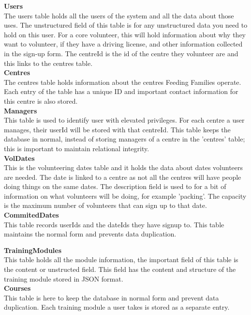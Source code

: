 \documentclass[12pt]{article}
\begin{document}
\noindent
\textbf{Users}\\
The users table holds all the users of the system and all the data about those uses. The unstructured field of this table is for any unstructured data you need to hold on this user. For a core volunteer, this will hold information about why they want to volunteer, if they have a driving license, and other information collected in the sign-up form. The centreId is the id of the centre they volunteer are and this links to the centres table.\\

\noindent
\textbf{Centres}\\
The centres table holds information about the centres Feeding Families operate. Each entry of the table has a unique ID and important contact information for this centre is also stored.\\

\noindent
\textbf{Managers}\\
This table is used to identify user with elevated privileges. For each centre a user manages, their userId will be stored with that centreId. This table keeps the database in normal, instead of storing managers of a centre in the 'centres' table; this is important to maintain relational integrity.\\

\noindent
\textbf{VolDates}\\
This is the volunteering dates table and it holds the data about dates volunteers are needed. The date is linked to a centre as not all the centres will have people doing things on the same dates. The description field is used to for a bit of information on what volunteers will be doing, for example 'packing'. The capacity is the maximum number of volunteers that can sign up to that date.\\

\noindent
\textbf{CommitedDates}\\
This table records userIds and the dateIds they have signup to. This table maintains the normal form and prevents data duplication.

\noindent
\textbf{TrainingModules}\\
This table holds all the module information, the important field of this table is the content or unstructed field. This field has the content and structure of the training module stored in JSON format.\\

\noindent
\textbf{Courses}\\
This table is here to keep the database in normal form and prevent data duplication. Each training module a user takes is stored as a separate entry.\\
\end{document}

